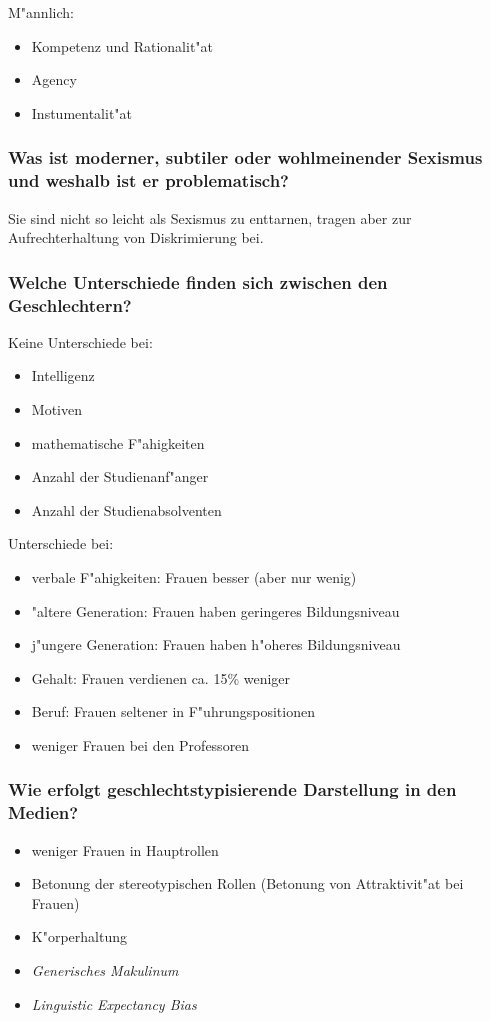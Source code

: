 \noindent M"annlich:
\begin{itemize}
        \item Kompetenz und Rationalit"at
        \item Agency
        \item Instumentalit"at
\end{itemize}

\subsubsection{Was ist moderner, subtiler oder wohlmeinender Sexismus und weshalb ist er problematisch?}
Sie sind nicht so leicht als Sexismus zu enttarnen, tragen aber zur Aufrechterhaltung von Diskrimierung bei.

\subsubsection{Welche Unterschiede finden sich zwischen den Geschlechtern?}
Keine Unterschiede bei:
\begin{itemize}
        \item Intelligenz
        \item Motiven
        \item mathematische F"ahigkeiten
        \item Anzahl der Studienanf"anger
        \item Anzahl der Studienabsolventen
\end{itemize}

\noindent Unterschiede bei:
\begin{itemize}
        \item verbale F"ahigkeiten: Frauen besser (aber nur wenig)
        \item "altere Generation: Frauen haben geringeres Bildungsniveau
        \item j"ungere Generation: Frauen haben h"oheres Bildungsniveau
        \item Gehalt: Frauen verdienen ca. 15\% weniger
        \item Beruf: Frauen seltener in F"uhrungspositionen
        \item weniger Frauen bei den Professoren
\end{itemize}

\subsubsection{Wie erfolgt geschlechtstypisierende Darstellung in den Medien?}
\begin{itemize}
        \item weniger Frauen in Hauptrollen
        \item Betonung der stereotypischen Rollen (Betonung von Attraktivit"at bei Frauen)
        \item K"orperhaltung
        \item \emph{Generisches Makulinum}
        \item \emph{Linguistic Expectancy Bias}
\end{itemize}
